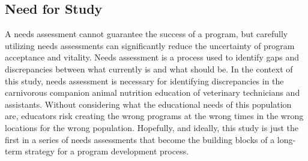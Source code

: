\subsection{Need for Study}
A needs assessment cannot guarantee the success of a program, but carefully utilizing needs assessments can significantly reduce the uncertainty of program acceptance and vitality\citep{queeney}. Needs assessment is a process used to identify gaps and discrepancies between what currently is and what should be\citep{queeney}. In the context of this study, needs assessment is necessary for identifying discrepancies in the carnivorous companion animal nutrition education of veterinary technicians and assistants. Without considering what the educational needs of this population are, educators risk creating the wrong programs at the wrong times in the wrong locations for the wrong population\citep{queeney}. Hopefully, and ideally, this study is just the first in a series of needs assessments that become the building blocks of a long-term strategy for a program development process\citep{queeney}.

